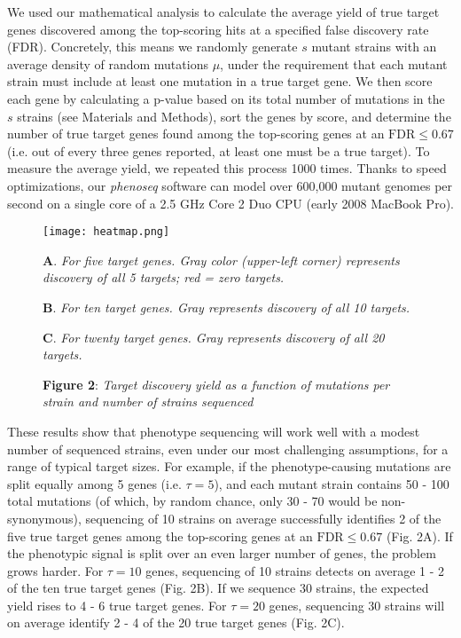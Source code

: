 \documentclass[letterpaper,10pt,english]{howto}
\begin{document}
We used our mathematical analysis to calculate the average
yield of true target genes discovered among the top-scoring hits
at a specified false discovery rate (FDR).  Concretely, this means
we randomly generate $s$ mutant strains with an average
density of random mutations $\mu$, under the requirement
that each mutant strain must include at least one mutation in
a true target gene.  We then score each gene by calculating
a p-value based on its total number of mutations in the $s$
strains (see Materials and Methods), sort the genes by
score, and determine the number of true target genes found among
the top-scoring genes at an $\text{FDR}\le 0.67$ (i.e. out
of every three genes reported, at least one must be a true target).
To measure the average yield, we repeated this process 1000 times.
Thanks to speed optimizations, our \emph{phenoseq} software can
model over 600,000 mutant genomes per second on a single core
of a 2.5 GHz Core 2 Duo CPU (early 2008 MacBook Pro).
\hypertarget{heatmapfig}{}\begin{figure}[htbp]
\centering

\texttt{[image: heatmap.png]}
\caption{\textbf{Figure 2}: \emph{Target discovery yield as a function of mutations per strain and number of strains sequenced}}{\small 
\textbf{A}. \emph{For five target genes.  Gray color (upper-left corner) represents
discovery of all 5 targets; red = zero targets.}

\textbf{B}. \emph{For ten target genes.  Gray represents discovery of all 10 targets.}

\textbf{C}. \emph{For twenty target genes. Gray represents discovery of all 20
targets.}
}\end{figure}

These results show that phenotype sequencing will work well
with a modest number of sequenced strains,
even under our most challenging assumptions, for a
range of typical target sizes.  For example, if the phenotype-causing
mutations are split equally among 5 genes
(i.e. $\tau=5$),
and each mutant strain contains 50 - 100 total mutations
(of which, by random chance, only 30 - 70 would be non-synonymous),
sequencing of 10 strains on average successfully identifies 2 of
the five true target genes among the top-scoring genes at an
$\text{FDR}\le 0.67$ (Fig. 2A).  If the phenotypic signal
is split over an even larger number of genes, the problem grows
harder.  For $\tau=10$ genes, sequencing of 10 strains
detects on average 1 - 2 of the ten true target genes (Fig. 2B).
If we sequence 30 strains, the expected yield rises to 4 - 6
true target genes.  For $\tau=20$ genes, sequencing
30 strains will on average identify 2 - 4 of the 20 true target
genes (Fig. 2C).
\end{document}

